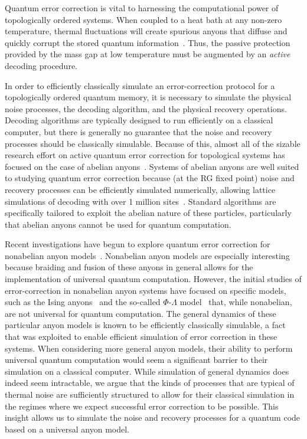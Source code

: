 \documentclass[aps, prl, letterpaper, twocolumn, superscriptaddress, notitlepage, 10pt]{revtex4}
\begin{document}
Quantum error correction is vital to harnessing the computational power of topologically 
ordered systems. When coupled to a heat bath at any non-zero temperature, thermal fluctuations 
will create spurious anyons that diffuse and quickly corrupt the stored quantum 
information~\cite{Pastawski2010}. Thus, the passive protection provided by the mass gap 
at low temperature must be augmented by an \emph{active} decoding procedure. 

In order to efficiently classically simulate an error-correction protocol for 
a topologically ordered quantum memory, it is necessary to simulate 
the physical noise processes, the decoding algorithm, and the physical recovery operations. 
Decoding algorithms are typically designed to run efficiently on a 
classical computer, but there is generally no guarantee that the 
noise and recovery processes should be classically simulable.
Because of this, almost all of the sizable research effort 
on active quantum error correction for topological systems has focused 
on the case of abelian anyons~\cite{Dennis2002, Duclos-Cianci2010, Duclos-Cianci2010a, Wang2010, Wang2010a, Duclos-Cianci2013, Bravyi2011, Bombin2012, Wootton2012, Anwar2014, Watson2014, Hutter2014a, Bravyi2014, Wootton2015, Fowler2015, Andrist2015}.
Systems of abelian anyons are well suited to studying quantum 
error correction because (at the RG fixed point) noise and 
recovery processes can be efficiently simulated numerically, allowing lattice simulations 
of decoding with over 1 million sites~\cite{Duclos-Cianci2010}. 
Standard algorithms are specifically tailored to exploit the abelian nature 
of these particles, particularly that abelian anyons cannot be used for quantum computation. 

Recent investigations have begun to explore quantum error correction for nonabelian anyon 
models~\cite{Brell2013, Wootton2013, Hutter2014, Wootton2015b}. Nonabelian anyon models are especially interesting 
because braiding and fusion of these anyons in general allows for the implementation of universal quantum 
computation. However, the initial studies of error-correction in nonabelian anyon systems have focused on specific models, such as the Ising 
anyons~\cite{Brell2013} and the so-called $\Phi$-$\Lambda$ 
model~\cite{Wootton2013, Hutter2014} that, while nonabelian, are not universal for quantum computation. The general dynamics of these particular anyon models is known to be efficiently classically simulable, a fact
that was exploited to enable efficient simulation of error correction 
in these systems. When considering more general anyon models, their 
ability to perform universal quantum computation would seem a significant 
barrier to their simulation on a classical computer. While simulation 
of general dynamics does indeed seem intractable, we argue that 
the kinds of processes that are typical of thermal noise 
are sufficiently structured  to allow for their classical simulation 
in the regimes where we expect successful error correction to 
be possible. This insight allows us to simulate the noise 
and recovery processes for a quantum code based on a universal anyon model.
\end{document}

